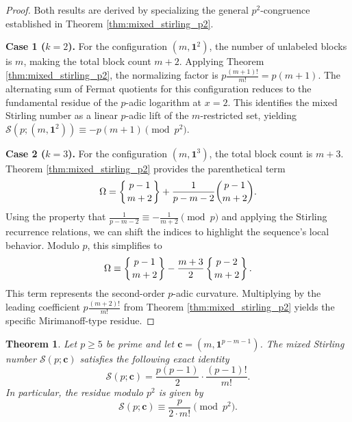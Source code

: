 \documentclass[12pt]{amsart}
\newtheorem{theorem}{Theorem}[section]
\theoremstyle{definition}
\begin{document}
\begin{proof}
Both results are derived by specializing the general $p^2$-congruence established in Theorem \ref{thm:mixed_stirling_p2}.

\textbf{Case 1 ($k=2$).} 
For the configuration $(m, \mathbf{1}^2)$, the number of unlabeled blocks is $m$, making the total block count $m+2$. Applying Theorem \ref{thm:mixed_stirling_p2}, the normalizing factor is $p \frac{(m+1)!}{m!} = p(m+1)$. The alternating sum of Fermat quotients for this configuration reduces to the fundamental residue of the $p$-adic logarithm at $x=2$. This identifies the mixed Stirling number as a linear $p$-adic lift of the $m$-restricted set, yielding $\mathcal{S}(p; (m, \mathbf{1}^2)) \equiv -p(m+1) \pmod{p^2}$.

\textbf{Case 2 ($k=3$).} 
For the configuration $(m, \mathbf{1}^3)$, the total block count is $m+3$. Theorem \ref{thm:mixed_stirling_p2} provides the parenthetical term
\begin{equation*}
    \Omega = \left\{ \genfrac{}{}{0pt}{}{p-1}{m+2} \right\} + \frac{1}{p-m-2} \binom{p-1}{m+2}.
\end{equation*}
Using the property that $\frac{1}{p-m-2} \equiv -\frac{1}{m+2} \pmod p$ and applying the Stirling recurrence relations, we can shift the indices to highlight the sequence's local behavior. Modulo $p$, this simplifies to
\begin{equation*}
    \Omega \equiv \left\{ \genfrac{}{}{0pt}{}{p-1}{m+2} \right\} - \frac{m+3}{2} \left\{ \genfrac{}{}{0pt}{}{p-2}{m+2} \right\}.
\end{equation*}
This term represents the second-order $p$-adic curvature. Multiplying by the leading coefficient $p \frac{(m+2)!}{m!}$ from Theorem \ref{thm:mixed_stirling_p2} yields the specific Mirimanoff-type residue.
\end{proof}
\begin{theorem}
\label{thm:mixed_boundary}
Let $p \ge 5$ be prime and let $\mathbf{c} = (m, \mathbf{1}^{p-m-1})$. The mixed Stirling number $\mathcal{S}(p; \mathbf{c})$ satisfies the following exact identity
\begin{equation}
    \mathcal{S}(p; \mathbf{c}) = \frac{p(p-1)}{2} \cdot \frac{(p-1)!}{m!}.
\end{equation}
In particular, the residue modulo $p^2$ is given by
\begin{equation}
    \mathcal{S}(p; \mathbf{c}) \equiv \frac{p}{2 \cdot m!} \pmod{p^2}.
\end{equation}
\end{theorem}
\end{document}
